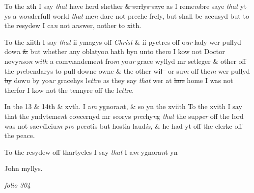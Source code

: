\documentclass[12pt, a4paper]{book}
\begin{document}
		\ifthenelse{\isodd{\thepage}}
		{\reversemarginpar}
		{\normalmarginpar}
		To the xth I say \textit{that} have herd shether \sout{\& serlys saye}
               as I reme\textit{m}bre
			 saye \textit{that} yt ys
a wo\textit{n}derfull world \textit{that }me\textit{n} dare not preche frely, but shall be accusyd
but to the resydew I ca\textit{n} not a\textit{n}swer, nother to xith.
            		
		\ifthenelse{\isodd{\thepage}}
		{\reversemarginpar}
		{\normalmarginpar}
		To the xiith I say \textit{that} ii ymagys off \textit{Christ} \& ii pyctres off o\textit{ur} lady wer pullyd
dow\textit{n}
               \sout{\&} but whether any oblatyo\textit{n} hath byn unto the\textit{m} I kow not
Doctor nevy\textit{n}so\textit{n} w\textit{ith} a com\textit{m}andeme\textit{n}t fro\textit{m} yo\textit{ur} grace wyllyd mr setleger \&
other off the p\textit{re}bendarys to pull downe owne \& the other \sout{wil }
                or su\textit{m} off the\textit{m}
			wer
pullyd \sout{by }dow\textit{n} by yo\textit{ur} gracehys l\textit{ett}re as they say \textit{that} wer at \sout{hoe} home
I was not therfor I kow not the tennyre off the l\textit{ett}re.
            		
		\ifthenelse{\isodd{\thepage}}
		{\reversemarginpar}
		{\normalmarginpar}
		In the 13 \& 14th \& xvth. I a\textit{m} ygnora\textit{n}t, \& so yn the xviith
To the xvith I say that the yndyteme\textit{n}t co\textit{n}cernyd mr scorys p\textit{re}chy\textit{n}g
\textit{that} the sup\textit{per} off the lord was not sac\textit{ri}ficiu\textit{m}
               \textit{pro} p\textit{e}c\textit{a}tis but hostia laud\textit{is},
\& he had yt off the clerke off the peace. 
            		
		\ifthenelse{\isodd{\thepage}}
		{\reversemarginpar}
		{\normalmarginpar}
		To the resydew off thartycles I say \textit{that} I a\textit{m} ygnora\textit{n}t yn


		\ifthenelse{\isodd{\thepage}}
		{\reversemarginpar}
		{\normalmarginpar}
		John myllys.

\dotfill
						\newpage
{}

\textit{folio 304}


         \vspace*{4cm}
         
\dotfill
						  \section*{}
\end{document}
